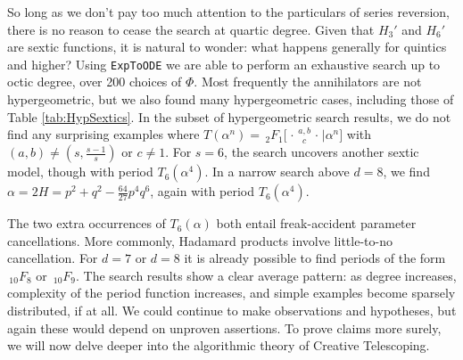 \documentclass[nofootinbib,preprint]{revtex4-1}
\newcommand{\tFoIn}[3]{\,_2F_1 \Big[ 
\genfrac..{0pt}{}{#1}{#2}\Big| #3 \Big]}
\begin{document}
So long as we don't pay too much attention to the particulars of series reversion, 
there is no reason to cease the search at quartic degree. Given that $H_3'$ and $H_6'$ are sextic 
functions, it is natural to wonder: what happens generally for quintics and higher? 
Using \texttt{ExpToODE} we are able to perform an exhaustive search up to octic degree, 
over 200 choices of $\Phi$. Most frequently the annihilators are not hypergeometric,
but we also found many hypergeometric cases, including those of Table \ref{tab:HypSextics}. 
In the subset of hypergeometric search results, we do not find any surprising examples 
where $T(\alpha^n)=\tFoIn{a,b}{c}{\alpha^n}$ with 
$(a,b) \neq (s,\frac{s-1}{s})$ or $c \neq 1$. For $s=6$, the search uncovers another 
sextic model, though with period $T_6(\alpha^4)$. 
In a narrow search above $d=8$, we find $\alpha =2H=p^2 + q^2 - \frac{64}{27} p ^4 q^6$, 
again with period $T_6(\alpha^4)$. 

The two extra  occurrences of $T_6(\alpha)$ both entail freak-accident parameter cancellations. 
More commonly, Hadamard products involve little-to-no cancellation. For $d=7$ or $d=8$ it is 
already possible to find periods of the form $\,_{10}F_8$ or $\,_{10}F_9$. The search results 
show a clear average pattern: as degree increases, complexity of the period function increases,
and simple examples become sparsely distributed, if at all. We could continue to make
observations and hypotheses, but again these would depend on unproven assertions. 
To prove claims more surely, we will now delve deeper into the algorithmic theory 
of Creative Telescoping. 

\pagebreak
\end{document}
